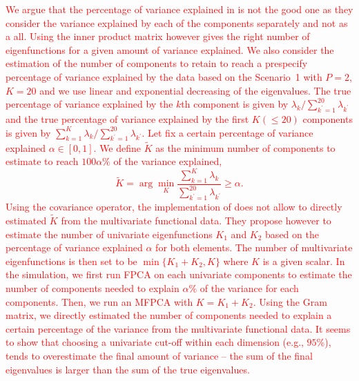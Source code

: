 \textcolor{red}{We argue that the percentage of variance explained in \cite{happMultivariateFunctionalPrincipal2018a} is not the good one as they consider the variance explained by each of the components separately and not as a all. Using the inner product matrix however gives the right number of eigenfunctions for a given amount of variance explained.
We also consider the estimation of the number of components to retain to reach a prespecify percentage of variance explained by the data based on the Scenario~1 with $P = 2$, $K = 20$ and we use linear and exponential decreasing of the eigenvalues. The true percentage of variance explained by the $k$th component is given by $\lambda_k / \sum_{k^\prime = 1}^{20} \lambda_{k^\prime}$ and the true percentage of variance explained by the first $K (\leq 20)$ components is given by $\sum_{k = 1}^K \lambda_k / \sum_{k^\prime = 1}^{20} \lambda_{k^\prime}$.
Let fix a certain percentage of variance explained $\alpha \in [0, 1]$. We define $\widetilde{K}$ as the minimum number of components to estimate to reach $100\alpha\%$ of the variance explained,
\begin{equation}
    \widetilde{K} = \arg\min_K \frac{\sum_{k = 1}^K \lambda_k}{\sum_{k^\prime = 1}^{20} \lambda_{k^\prime}} \geq \alpha.
\end{equation}
Using the covariance operator, the implementation of \cite{happMultivariateFunctionalPrincipal2018a} does not allow to directly estimated $\widetilde{K}$ from the multivariate functional data. They propose however to estimate the number of univariate eigenfunctions $K_1$ and $K_2$ based on the percentage of variance explained $\alpha$ for both elements. The number of multivariate eigenfunctions is then set to be $\min\{K_1 + K_2, K\}$ where $K$ is a given scalar. In the simulation, we first run FPCA on each univariate components to estimate the number of components needed to explain $\alpha\%$ of the variance for each components. Then, we run an MFPCA with $K = K_1 + K_2$. Using the Gram matrix, we directly estimated the number of components needed to explain a certain percentage of the variance from the multivariate functional data.
It seems to show that choosing a univariate cut-off within each dimension (e.g., $95\%$), tends to overestimate the final amount of variance – the sum of the final eigenvalues is larger than the sum of the true eigenvalues.}




